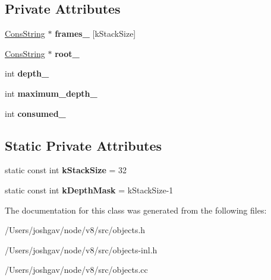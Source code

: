 \subsection*{Private Attributes}
\begin{DoxyCompactItemize}
\item 
\hyperlink{classv8_1_1internal_1_1_cons_string}{Cons\+String} $\ast$ {\bfseries frames\+\_\+} \mbox{[}k\+Stack\+Size\mbox{]}\hypertarget{classv8_1_1internal_1_1_cons_string_iterator_ab6b38e9ae9ef96a27b987cc754f8a496}{}\label{classv8_1_1internal_1_1_cons_string_iterator_ab6b38e9ae9ef96a27b987cc754f8a496}

\item 
\hyperlink{classv8_1_1internal_1_1_cons_string}{Cons\+String} $\ast$ {\bfseries root\+\_\+}\hypertarget{classv8_1_1internal_1_1_cons_string_iterator_a075a6ddf65cdfe6ab2250271abd82b74}{}\label{classv8_1_1internal_1_1_cons_string_iterator_a075a6ddf65cdfe6ab2250271abd82b74}

\item 
int {\bfseries depth\+\_\+}\hypertarget{classv8_1_1internal_1_1_cons_string_iterator_a666c6532606fc9e891430a2b660ea3da}{}\label{classv8_1_1internal_1_1_cons_string_iterator_a666c6532606fc9e891430a2b660ea3da}

\item 
int {\bfseries maximum\+\_\+depth\+\_\+}\hypertarget{classv8_1_1internal_1_1_cons_string_iterator_abc92fad455336abaf96b9d9331e26ce5}{}\label{classv8_1_1internal_1_1_cons_string_iterator_abc92fad455336abaf96b9d9331e26ce5}

\item 
int {\bfseries consumed\+\_\+}\hypertarget{classv8_1_1internal_1_1_cons_string_iterator_a3466eb9aa27333a5133ccda1d13c162b}{}\label{classv8_1_1internal_1_1_cons_string_iterator_a3466eb9aa27333a5133ccda1d13c162b}

\end{DoxyCompactItemize}
\subsection*{Static Private Attributes}
\begin{DoxyCompactItemize}
\item 
static const int {\bfseries k\+Stack\+Size} = 32\hypertarget{classv8_1_1internal_1_1_cons_string_iterator_a66bbfb69dfbcb46d1e9efe3d3aee6c01}{}\label{classv8_1_1internal_1_1_cons_string_iterator_a66bbfb69dfbcb46d1e9efe3d3aee6c01}

\item 
static const int {\bfseries k\+Depth\+Mask} = k\+Stack\+Size-\/1\hypertarget{classv8_1_1internal_1_1_cons_string_iterator_acd3ee2b6a5fbf2550dd7f6585691c278}{}\label{classv8_1_1internal_1_1_cons_string_iterator_acd3ee2b6a5fbf2550dd7f6585691c278}

\end{DoxyCompactItemize}


The documentation for this class was generated from the following files\+:\begin{DoxyCompactItemize}
\item 
/\+Users/joshgav/node/v8/src/objects.\+h\item 
/\+Users/joshgav/node/v8/src/objects-\/inl.\+h\item 
/\+Users/joshgav/node/v8/src/objects.\+cc\end{DoxyCompactItemize}
